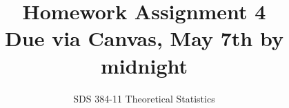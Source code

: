 \documentclass[11pt]{article}
\begin{document}
\title{{\bf Homework Assignment 4}\\Due via Canvas, May 7th by midnight}
\author{SDS 384-11 Theoretical Statistics}

\date{}

\maketitle{}
\begin{enumerate}%


\end{enumerate}
\end{document}
